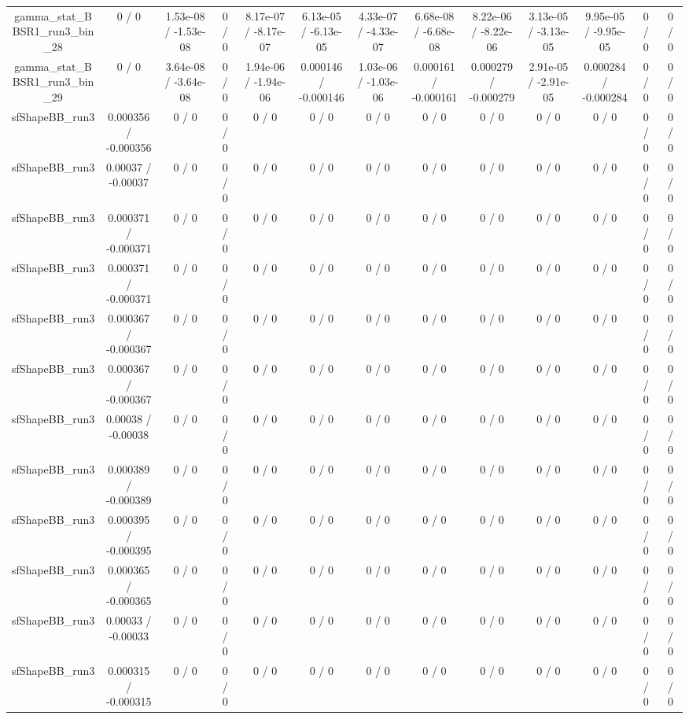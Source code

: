 \documentclass[10pt]{article}
\begin{document}
\begin{table}[htbp]
\begin{center}
\begin{tabular}{|c|c|c|c|c|c|c|c|c|c|c|c|c|}
  gamma_stat_BBSR1_run3_bin_28 & 0 / 0 & 1.53e-08 / -1.53e-08 & 0 / 0 & 8.17e-07 / -8.17e-07 & 6.13e-05 / -6.13e-05 & 4.33e-07 / -4.33e-07 & 6.68e-08 / -6.68e-08 & 8.22e-06 / -8.22e-06 & 3.13e-05 / -3.13e-05 & 9.95e-05 / -9.95e-05 & 0 / 0 & 0 / 0 \\ 
  gamma_stat_BBSR1_run3_bin_29 & 0 / 0 & 3.64e-08 / -3.64e-08 & 0 / 0 & 1.94e-06 / -1.94e-06 & 0.000146 / -0.000146 & 1.03e-06 / -1.03e-06 & 0.000161 / -0.000161 & 0.000279 / -0.000279 & 2.91e-05 / -2.91e-05 & 0.000284 / -0.000284 & 0 / 0 & 0 / 0 \\ 
  sfShapeBB_run3 & 0.000356 / -0.000356 & 0 / 0 & 0 / 0 & 0 / 0 & 0 / 0 & 0 / 0 & 0 / 0 & 0 / 0 & 0 / 0 & 0 / 0 & 0 / 0 & 0 / 0 \\ 
  sfShapeBB_run3 & 0.00037 / -0.00037 & 0 / 0 & 0 / 0 & 0 / 0 & 0 / 0 & 0 / 0 & 0 / 0 & 0 / 0 & 0 / 0 & 0 / 0 & 0 / 0 & 0 / 0 \\ 
  sfShapeBB_run3 & 0.000371 / -0.000371 & 0 / 0 & 0 / 0 & 0 / 0 & 0 / 0 & 0 / 0 & 0 / 0 & 0 / 0 & 0 / 0 & 0 / 0 & 0 / 0 & 0 / 0 \\ 
  sfShapeBB_run3 & 0.000371 / -0.000371 & 0 / 0 & 0 / 0 & 0 / 0 & 0 / 0 & 0 / 0 & 0 / 0 & 0 / 0 & 0 / 0 & 0 / 0 & 0 / 0 & 0 / 0 \\ 
  sfShapeBB_run3 & 0.000367 / -0.000367 & 0 / 0 & 0 / 0 & 0 / 0 & 0 / 0 & 0 / 0 & 0 / 0 & 0 / 0 & 0 / 0 & 0 / 0 & 0 / 0 & 0 / 0 \\ 
  sfShapeBB_run3 & 0.000367 / -0.000367 & 0 / 0 & 0 / 0 & 0 / 0 & 0 / 0 & 0 / 0 & 0 / 0 & 0 / 0 & 0 / 0 & 0 / 0 & 0 / 0 & 0 / 0 \\ 
  sfShapeBB_run3 & 0.00038 / -0.00038 & 0 / 0 & 0 / 0 & 0 / 0 & 0 / 0 & 0 / 0 & 0 / 0 & 0 / 0 & 0 / 0 & 0 / 0 & 0 / 0 & 0 / 0 \\ 
  sfShapeBB_run3 & 0.000389 / -0.000389 & 0 / 0 & 0 / 0 & 0 / 0 & 0 / 0 & 0 / 0 & 0 / 0 & 0 / 0 & 0 / 0 & 0 / 0 & 0 / 0 & 0 / 0 \\ 
  sfShapeBB_run3 & 0.000395 / -0.000395 & 0 / 0 & 0 / 0 & 0 / 0 & 0 / 0 & 0 / 0 & 0 / 0 & 0 / 0 & 0 / 0 & 0 / 0 & 0 / 0 & 0 / 0 \\ 
  sfShapeBB_run3 & 0.000365 / -0.000365 & 0 / 0 & 0 / 0 & 0 / 0 & 0 / 0 & 0 / 0 & 0 / 0 & 0 / 0 & 0 / 0 & 0 / 0 & 0 / 0 & 0 / 0 \\ 
  sfShapeBB_run3 & 0.00033 / -0.00033 & 0 / 0 & 0 / 0 & 0 / 0 & 0 / 0 & 0 / 0 & 0 / 0 & 0 / 0 & 0 / 0 & 0 / 0 & 0 / 0 & 0 / 0 \\ 
  sfShapeBB_run3 & 0.000315 / -0.000315 & 0 / 0 & 0 / 0 & 0 / 0 & 0 / 0 & 0 / 0 & 0 / 0 & 0 / 0 & 0 / 0 & 0 / 0 & 0 / 0 & 0 / 0 \\ 

\end{tabular}
\end{center}
\end{table}
\end{document}
